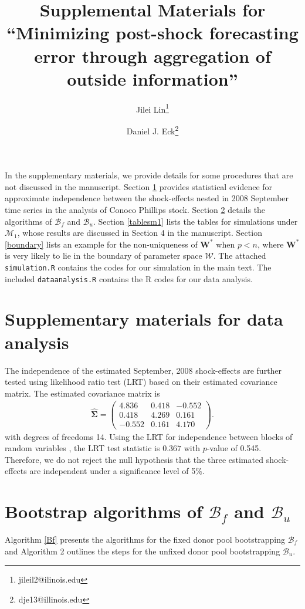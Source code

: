 \documentclass[11pt]{article}
\title{Supplemental Materials for ``Minimizing post-shock forecasting error through aggregation of outside information''}
\author{Jilei Lin\thanks{jileil2@ilinois.edu} }
\author{Daniel J. Eck\thanks{dje13@illinois.edu}}
\affil{Department of Statistics, University of Illinois at Urbana-Champaign}
\def\mbf#1{\mathbf{#1}} %
\def\mc#1{\mathcal{#1}} %
\theoremstyle{definition}
\begin{document}
\maketitle

In the supplementary materials, we provide details for some procedures that are not discussed in the manuscript. Section \ref{smfda} provides statistical evidence for approximate independence between  the shock-effects nested in 2008 September time series in the analysis of Conoco Phillips stock. Section \ref{bf} details the algorithms of $\mc{B}_f$ and $\mc{B}_u$. Section  \ref{tablesm1} lists the tables for simulations under $\mc{M}_1$, whose results are discussed in Section 4 in the manuscript. Section \ref{boundary} lists an example for the non-uniqueness of $\mbf{W}^*$ when $p < n$, where $\mbf{W}^*$ is very likely to lie in the boundary of parameter space $\mc{W}$. The attached \texttt{simulation.R} contains the codes for our simulation in the main text. The included \texttt{dataanalysis.R} contains the R codes for our data analysis. 


\section{Supplementary materials for data analysis}
\label{smfda}
The independence of the estimated September, 2008 shock-effects are further tested using likelihood ratio test (LRT) based on their estimated covariance matrix. The estimated covariance matrix is
\begin{align*}
  \hat{\mathbf{\Sigma}}=\left(\begin{array}{rrr}
    4.836 & 0.418 & -0.552 \\
    0.418 & 4.269 & 0.161 \\
    -0.552 & 0.161 & 4.170
  \end{array}\right).
\end{align*}
with degrees of freedoms 14. Using the LRT for independence between blocks of random variables \citep[Section 10.2]{msos}, the LRT test statistic is $0.367$ with $p$-value of 0.545. Therefore, we do not reject  the null hypothesis that the three estimated shock-effects are independent under a significance level of 5\%. 

\section{Bootstrap algorithms of  $\mc{B}_f$ and $\mc{B}_u$}
\label{bf}

Algorithm \ref{Bf} presents the algorithms for the fixed donor pool bootstrapping  $\mc{B}_f$ and Algorithm 2 outlines the steps for the unfixed donor pool bootstrapping $\mc{B}_u$.
\end{document}
